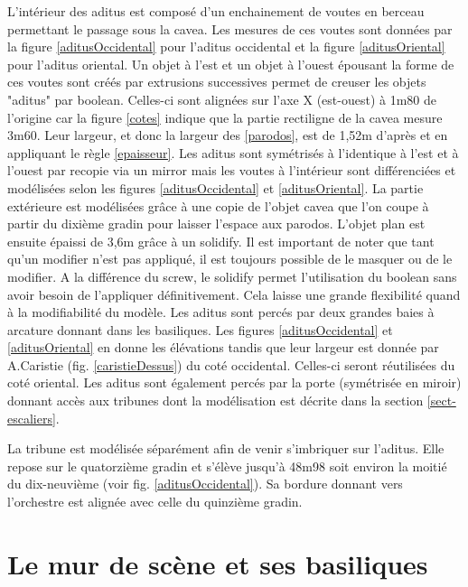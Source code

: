 L'intérieur des aditus est composé d'un enchainement de voutes en berceau permettant le passage sous la cavea. Les mesures de ces voutes sont données par la figure \ref{aditusOccidental} pour l'aditus occidental et la figure \ref{aditusOriental} pour l'aditus oriental. Un objet à l'est et un objet à l'ouest épousant la forme de ces voutes sont créés par extrusions successives permet de creuser les objets "aditus" par \gls{boolean}. Celles-ci sont alignées sur l'axe X (est-ouest) à 1m80 de l'origine car la figure \ref{cotes} indique que la partie rectiligne de la cavea mesure 3m60. Leur largeur, et donc la largeur des \ref{parodos}, est de 1,52m d'après \cite[Pl. XXI]{orangePl} et en appliquant le règle \ref{epaisseur}. Les aditus sont symétrisés à l'identique à l'est et à l'ouest par recopie via un \gls{mirror} mais les voutes à l'intérieur sont différenciées et modélisées selon les figures \ref{aditusOccidental} et \ref{aditusOriental}. La partie extérieure est modélisées grâce à une copie de l'objet cavea que l'on coupe à partir du dixième gradin pour laisser l'espace aux \gls{parodos}. L'objet plan est ensuite épaissi de 3,6m grâce à un \gls{solidify}. Il est important de noter que tant qu'un modifier n'est pas appliqué, il est toujours possible de le masquer ou de le modifier. A la différence du \gls{screw}, le \gls{solidify} permet l'utilisation du \gls{boolean} sans avoir besoin de l'appliquer définitivement. Cela laisse une grande flexibilité quand à la modifiabilité du modèle. Les aditus sont percés par deux grandes baies à arcature donnant dans les basiliques. Les figures \ref{aditusOccidental} et \ref{aditusOriental} en donne les élévations tandis que leur largeur est donnée par A.Caristie (fig. \ref{caristieDessus}) du coté occidental. Celles-ci seront réutilisées du coté oriental. Les aditus sont également percés par la porte (symétrisée en miroir) donnant accès aux tribunes dont la modélisation est décrite dans la section \ref{sect-escaliers}.

La tribune est modélisée séparément afin de venir s'imbriquer sur l'aditus. Elle repose sur le quatorzième gradin et s'élève jusqu'à 48m98 soit environ la moitié du dix-neuvième (voir fig. \ref{aditusOccidental}). Sa bordure donnant vers l'orchestre est alignée avec celle du quinzième gradin.

		\section{Le mur de scène et ses basiliques} 
		\label{mur}


